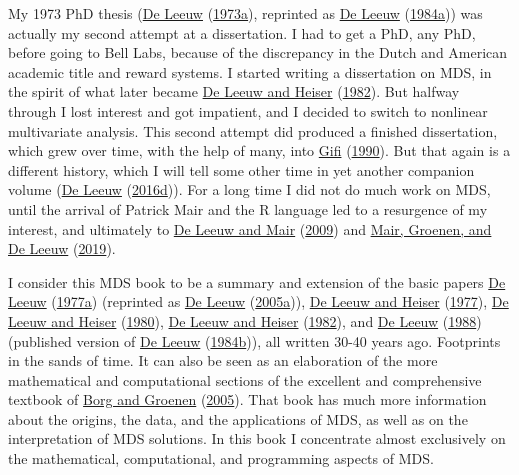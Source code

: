 \documentclass[
  12pt,
]{book}
\theoremstyle{definition}
\theoremstyle{definition}
\theoremstyle{definition}
\theoremstyle{definition}
\theoremstyle{remark}
\begin{document}
My 1973 PhD thesis (\protect\hyperlink{ref-deleeuw_B_73}{De Leeuw} (\protect\hyperlink{ref-deleeuw_B_73}{1973a}), reprinted as \protect\hyperlink{ref-deleeuw_B_84}{De Leeuw} (\protect\hyperlink{ref-deleeuw_B_84}{1984a})) was
actually my second attempt at a dissertation. I had to get a PhD, any
PhD, before going to Bell Labs, because of the discrepancy in the Dutch
and American academic title and reward systems. I started writing a
dissertation on MDS, in the spirit of what later became
\protect\hyperlink{ref-deleeuw_heiser_C_82}{De Leeuw and Heiser} (\protect\hyperlink{ref-deleeuw_heiser_C_82}{1982}). But halfway through I lost interest and got
impatient, and I decided to switch to nonlinear multivariate analysis.
This second attempt did produced a finished dissertation, which
grew over time, with the help of many, into \protect\hyperlink{ref-gifi_B_90}{Gifi} (\protect\hyperlink{ref-gifi_B_90}{1990}). But that again is a
different history, which I will tell some other time in yet another
companion volume (\protect\hyperlink{ref-deleeuw_B_16a}{De Leeuw} (\protect\hyperlink{ref-deleeuw_B_16a}{2016d})). For a long time I did not do much
work on MDS, until the arrival of Patrick Mair and the R language led to
a resurgence of my interest, and ultimately to \protect\hyperlink{ref-deleeuw_mair_A_09c}{De Leeuw and Mair} (\protect\hyperlink{ref-deleeuw_mair_A_09c}{2009}) and
\protect\hyperlink{ref-mair_groenen_deleeuw_A_19}{Mair, Groenen, and De Leeuw} (\protect\hyperlink{ref-mair_groenen_deleeuw_A_19}{2019}).

I consider this MDS book to be a summary and extension of the basic
papers \protect\hyperlink{ref-deleeuw_C_77}{De Leeuw} (\protect\hyperlink{ref-deleeuw_C_77}{1977a}) (reprinted as \protect\hyperlink{ref-deleeuw_R_05b}{De Leeuw} (\protect\hyperlink{ref-deleeuw_R_05b}{2005a})),
\protect\hyperlink{ref-deleeuw_heiser_C_77}{De Leeuw and Heiser} (\protect\hyperlink{ref-deleeuw_heiser_C_77}{1977}), \protect\hyperlink{ref-deleeuw_heiser_C_80}{De Leeuw and Heiser} (\protect\hyperlink{ref-deleeuw_heiser_C_80}{1980}), \protect\hyperlink{ref-deleeuw_heiser_C_82}{De Leeuw and Heiser} (\protect\hyperlink{ref-deleeuw_heiser_C_82}{1982}), and
\protect\hyperlink{ref-deleeuw_A_88b}{De Leeuw} (\protect\hyperlink{ref-deleeuw_A_88b}{1988}) (published version of \protect\hyperlink{ref-deleeuw_R_84c}{De Leeuw} (\protect\hyperlink{ref-deleeuw_R_84c}{1984b})), all written 30-40
years ago. Footprints in the sands of time. It can also be seen as an
elaboration of the more mathematical and computational sections of the excellent and
comprehensive textbook of \protect\hyperlink{ref-borg_groenen_05}{Borg and Groenen} (\protect\hyperlink{ref-borg_groenen_05}{2005}). That book has much more
information about the origins, the data, and the applications of MDS, as
well as on the interpretation of MDS solutions. In this book I
concentrate almost exclusively on the mathematical, computational, and
programming aspects of MDS.
\end{document}
